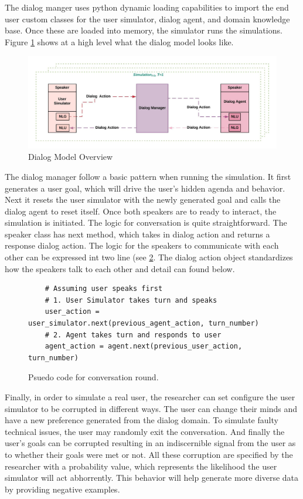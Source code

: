 The dialog manger uses python dynamic loading capabilities to import the end user custom classes for the user simulator, dialog agent, and domain knowledge base. Once these are loaded into memory, the simulator runs the simulations. Figure \ref{fig:dialog_model} shows at a high level what the dialog model looks like. 
\begin{figure}[h!]
	\includegraphics[width=\linewidth]{diagrams/dialog_model.jpeg}
	\caption{ Dialog Model Overview}
	\label{fig:dialog_model}
\end{figure}

The dialog manager follow a basic pattern when running the simulation. It first generates a user goal, which will drive the user's hidden agenda and behavior. Next it resets the user simulator with the newly generated goal and calls the dialog agent to reset itself. Once both speakers are to ready to interact, the simulation is initiated. The logic for conversation is quite straightforward. The speaker class has next method, which takes in dialog action and returns a response dialog action. The logic for the speakers to communicate with each other can be expressed int two line (see  \ref{fig:conv_round}. The dialog action object standardizes how the speakers talk to each other and detail can found below.  

\begin{figure}[h!]
	\caption{Psuedo code for conversation round.}
	\label{fig:conv_round}
	\begin{lstlisting}
	# Assuming user speaks first 
	# 1. User Simulator takes turn and speaks
	user_action = user_simulator.next(previous_agent_action, turn_number)
	# 2. Agent takes turn and responds to user 
	agent_action = agent.next(previous_user_action, turn_number)
	\end{lstlisting}
\end{figure}

Finally, in order to simulate a real user, the researcher can set configure the user simulator to be corrupted in different ways. The user can change their minds and have a new preference generated from the dialog domain. To simulate faulty technical issues, the user may randomly exit the conversation. And finally the user's goals can be corrupted resulting in an indiscernible signal from the user as to whether their goals were met or not. All these corruption are specified by the researcher with a probability value, which represents the likelihood the user simulator will  act abhorrently. This behavior will help generate more diverse data  by providing negative examples.

